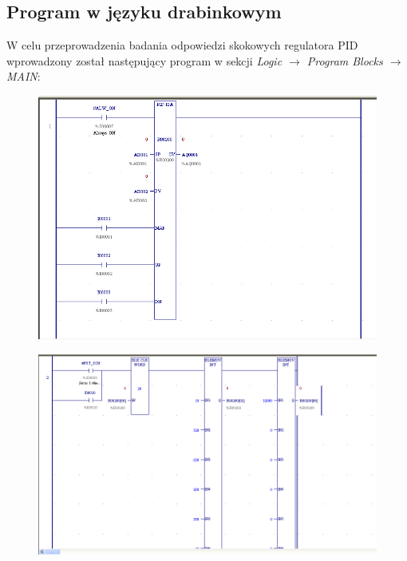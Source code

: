 \documentclass[12pt]{article}
\begin{document}
\subsection{Program w języku drabinkowym}
W celu przeprowadzenia badania odpowiedzi skokowych regulatora PID wprowadzony został następujący program w sekcji \textit{Logic $\rightarrow$ Program Blocks $\rightarrow$ MAIN}:

\begin{figure}[H]
    \centering
    \includegraphics[scale=0.7]{./zdj/network1.png}
\end{figure}
\begin{figure}[H]
    \centering
    \includegraphics[width = \textwidth]{./zdj/network2.png}
\end{figure}
\end{document}
